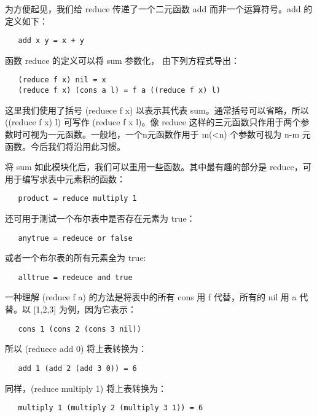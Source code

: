 \documentclass[12pt]{article}
\begin{document}
为方便起见，我们给 reduce 传递了一个二元函数 add 而非一个运算符号。add 的定义如下：

\begin{verbatim}
   add x y = x + y
\end{verbatim}

函数 reduce 的定义可以将 sum 参数化， 由下列方程式导出：

\begin{verbatim}
   (reduce f x) nil = x
   (reduce f x) (cons a l) = f a ((reduce f x) l)
\end{verbatim}

这里我们使用了括号 (reduece f x) 以表示其代表 sum。通常括号可以省略，所以 ((reduce f x) l) 可写作 (reduce f x l)。像 reduce 这样的三元函数只作用于两个参数时可视为一元函数。一般地，一个n元函数作用于 m(<n) 个参数可视为 n-m 元函数。今后我们将沿用此习惯。

将 sum 如此模块化后，我们可以重用一些函数。其中最有趣的部分是 reduce，可用于编写求表中元素积的函数：

\begin{verbatim}
   product = reduce multiply 1
\end{verbatim}

还可用于测试一个布尔表中是否存在元素为 true：

\begin{verbatim}
   anytrue = redeuce or false
\end{verbatim}

或者一个布尔表的所有元素全为 true:

\begin{verbatim}
   alltrue = redeuce and true
\end{verbatim}

一种理解 (reduce f a) 的方法是将表中的所有 cons 用 f 代替，所有的 nil 用 a 代替。以 [1,2,3] 为例，因为它表示：

\begin{verbatim}
   cons 1 (cons 2 (cons 3 nil))
\end{verbatim}

所以 (reduece add 0) 将上表转换为：

\begin{verbatim}
   add 1 (add 2 (add 3 0)) = 6
\end{verbatim}

同样，(reduce multiply 1) 将上表转换为：

\begin{verbatim}
   multiply 1 (multiply 2 (multiply 3 1)) = 6
\end{verbatim}
\end{document}
